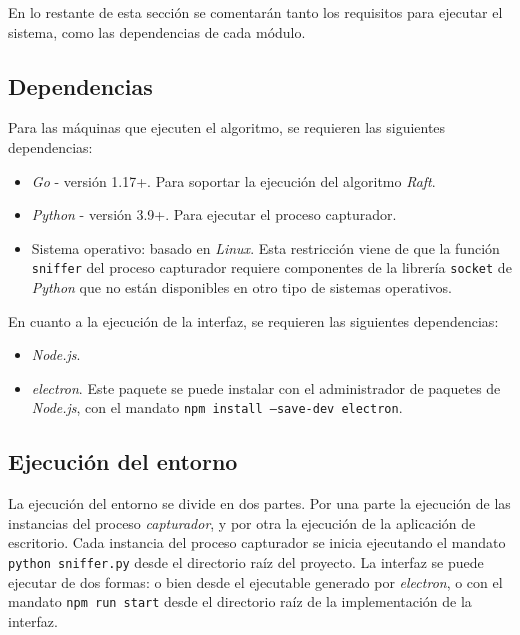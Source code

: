En lo restante de esta sección se comentarán tanto los requisitos para ejecutar el sistema, como las dependencias de cada módulo.

\subsection{Dependencias}

Para las máquinas que ejecuten el algoritmo, se requieren las siguientes dependencias:

\begin{itemize}
\item \textit{Go} - versión 1.17+. Para soportar la ejecución del algoritmo \textit{Raft}.
\item \textit{Python} - versión 3.9+. Para ejecutar el proceso capturador.
\item Sistema operativo: basado en \textit{Linux}. Esta restricción viene de que la función \texttt{sniffer} del proceso capturador requiere componentes de la librería \texttt{socket} de \textit{Python} que no están disponibles en otro tipo de sistemas operativos.
\end{itemize}

En cuanto a la ejecución de la interfaz, se requieren las siguientes dependencias:

\begin{itemize}
\item \textit{Node.js}.
\item \textit{electron}. Este paquete se puede instalar con el administrador de paquetes de \textit{Node.js}, con el mandato \texttt{npm install --save-dev electron}.
\end{itemize}

\newpage

\subsection{Ejecución del entorno}

La ejecución del entorno se divide en dos partes. Por una parte la ejecución de las instancias del proceso \textit{capturador}, y por  otra la ejecución de la aplicación de escritorio. Cada instancia del proceso capturador se inicia ejecutando el mandato \texttt{python sniffer.py} desde el directorio raíz del proyecto. La interfaz se puede ejecutar de dos formas: o bien desde el ejecutable generado por \textit{electron}, o con el mandato \texttt{npm run start} desde el directorio raíz de la implementación de la interfaz.
